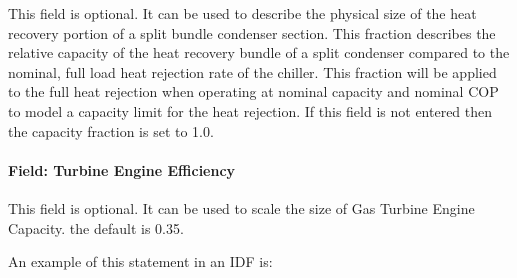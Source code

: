 This field is optional. It can be used to describe the physical size of the heat recovery portion of a split bundle condenser section. This fraction describes the relative capacity of the heat recovery bundle of a split condenser compared to the nominal, full load heat rejection rate of the chiller. This fraction will be applied to the full heat rejection when operating at nominal capacity and nominal COP to model a capacity limit for the heat rejection. If this field is not entered then the capacity fraction is set to 1.0.

\paragraph{Field: Turbine Engine Efficiency}\label{field-engine-efficiency}

This field is optional.  It can be used to scale the size of Gas Turbine Engine Capacity.  the default is 0.35.

An example of this statement in an IDF is:

